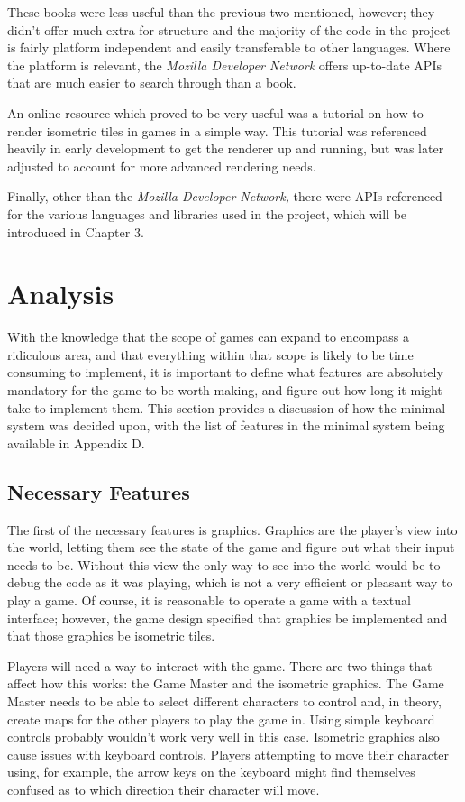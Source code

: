 These books were less useful than the previous two mentioned, however; they didn't offer much extra for structure and the majority of the code in the project is fairly platform independent and easily transferable to other languages. Where the platform is relevant, the \textit{Mozilla Developer Network}\cite{citeulike:13151262} offers up-to-date APIs that are much easier to search through than a book.

An online resource which proved to be very useful was a tutorial on how to render isometric tiles in games in a simple way\cite{citeulike:13139216}. This tutorial was referenced heavily in early development to get the renderer up and running, but was later adjusted to account for more advanced rendering needs.

Finally, other than the \textit{Mozilla Developer Network,} there were APIs referenced for the various languages and libraries used in the project, which will be introduced in Chapter 3.

\section{Analysis}
With the knowledge that the scope of games can expand to encompass a ridiculous area, and that everything within that scope is likely to be time consuming to implement, it is important to define what features are absolutely mandatory for the game to be worth making, and figure out how long it might take to implement them. This section provides a discussion of how the minimal system was decided upon, with the list of features in the minimal system being available in Appendix D.

\subsection{Necessary Features}
The first of the necessary features is graphics. Graphics are the player's view into the world, letting them see the state of the game and figure out what their input needs to be. Without this view the only way to see into the world would be to debug the code as it was playing, which is not a very efficient or pleasant way to play a game. Of course, it is reasonable to operate a game with a textual interface; however, the game design specified that graphics be implemented and that those graphics be isometric tiles.

Players will need a way to interact with the game. There are two things that affect how this works: the Game Master and the isometric graphics. The Game Master needs to be able to select different characters to control and, in theory, create maps for the other players to play the game in. Using simple keyboard controls probably wouldn't work very well in this case. Isometric graphics also cause issues with keyboard controls. Players attempting to move their character using, for example, the arrow keys on the keyboard might find themselves confused as to which direction their character will move.

